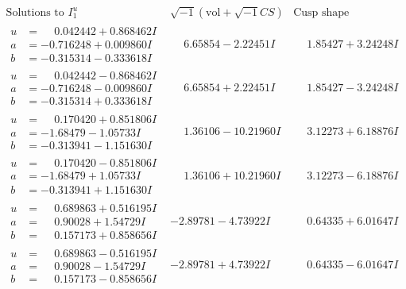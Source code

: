 \documentclass[1p]{elsarticle_modified}
\theoremstyle{definition}
\newcommand{\I}{\sqrt{-1}}
\begin{document}
$$\begin{array}{c|c|c}  
\text{Solutions to }I^u_{1}& \I (\text{vol} + \sqrt{-1}CS) & \text{Cusp shape}\\
 \hline 
\begin{aligned}
u &= \phantom{-}0.042442 + 0.868462 I \\
a &= -0.716248 + 0.009860 I \\
b &= -0.315314 - 0.333618 I\end{aligned}
 & \phantom{-}6.65854 - 2.22451 I & \phantom{-}1.85427 + 3.24248 I \\ \hline\begin{aligned}
u &= \phantom{-}0.042442 - 0.868462 I \\
a &= -0.716248 - 0.009860 I \\
b &= -0.315314 + 0.333618 I\end{aligned}
 & \phantom{-}6.65854 + 2.22451 I & \phantom{-}1.85427 - 3.24248 I \\ \hline\begin{aligned}
u &= \phantom{-}0.170420 + 0.851806 I \\
a &= -1.68479 - 1.05733 I \\
b &= -0.313941 - 1.151630 I\end{aligned}
 & \phantom{-}1.36106 - 10.21960 I & \phantom{-}3.12273 + 6.18876 I \\ \hline\begin{aligned}
u &= \phantom{-}0.170420 - 0.851806 I \\
a &= -1.68479 + 1.05733 I \\
b &= -0.313941 + 1.151630 I\end{aligned}
 & \phantom{-}1.36106 + 10.21960 I & \phantom{-}3.12273 - 6.18876 I \\ \hline\begin{aligned}
u &= \phantom{-}0.689863 + 0.516195 I \\
a &= \phantom{-}0.90028 + 1.54729 I \\
b &= \phantom{-}0.157173 + 0.858656 I\end{aligned}
 & -2.89781 - 4.73922 I & \phantom{-}0.64335 + 6.01647 I \\ \hline\begin{aligned}
u &= \phantom{-}0.689863 - 0.516195 I \\
a &= \phantom{-}0.90028 - 1.54729 I \\
b &= \phantom{-}0.157173 - 0.858656 I\end{aligned}
 & -2.89781 + 4.73922 I & \phantom{-}0.64335 - 6.01647 I \\ \hline\begin{aligned}

\end{aligned}
\end{array}$$
\end{document}
